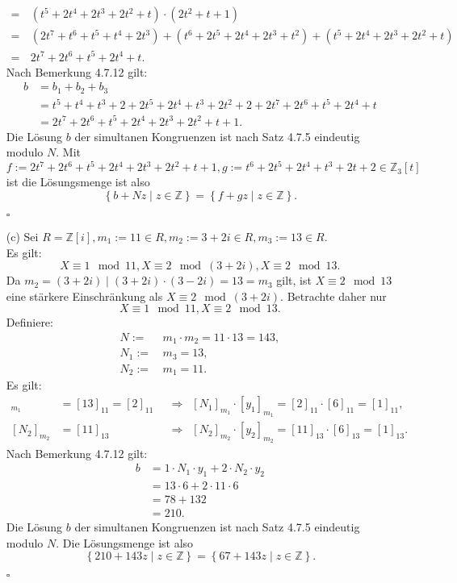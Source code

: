 \documentclass[12pt]{article}
\newcommand{\QED}{\begin{flushright} $\square$ \end{flushright}}
\newcommand{\df}{\enspace\Longrightarrow\enspace}
\begin{document}
\begin{enumerate}
\begin{align*}
		=&\,(t^5+2t^4+2t^3+2t^2+t)\cdot(2t^2+t+1) \\
		=&\,(2t^7+t^6+t^5+t^4+2t^3)+(t^6+2t^5+2t^4+2t^3+t^2)+(t^5+2t^4+2t^3+2t^2+t) \\
		=&\,2t^7+2t^6+t^5+2t^4+t.
	\end{align*}
	Nach Bemerkung 4.7.12 gilt:
	\begin{align*}
		b&=b_1+b_2+b_3 \\
		&=t^5+t^4+t^3+2+2t^5+2t^4+t^3+2t^2+2+2t^7+2t^6+t^5+2t^4+t \\
		&=2t^7+2t^6+t^5+2t^4+2t^3+2t^2+t+1.
	\end{align*}
	Die Lösung $b$ der simultanen Kongruenzen ist nach Satz 4.7.5 eindeutig modulo $N$. Mit $f:=2t^7+2t^6+t^5+2t^4+2t^3+2t^2+t+1,g:=t^6+2t^5+2t^4+t^3+2t+2\in\mathbb{Z}_3[t]$ ist die Lösungsmenge ist also
	$$\left\{b+Nz\mid z\in\mathbb{Z}\right\}=\left\{f+gz\mid z\in\mathbb{Z}\right\}.$$
	\QED
	
	\item[(c)] Sei $R=\mathbb{Z}[i],m_1:=11\in R,m_2:=3+2i\in R,m_3:=13\in R$. \\
	Es gilt: $$X\equiv1\mod11,X\equiv2\mod(3+2i),X\equiv2\mod13.$$
	Da $m_2=(3+2i)\mid(3+2i)\cdot(3-2i)=13=m_3$ gilt, ist $X\equiv2\mod13$ eine stärkere Einschränkung als $X\equiv2\mod(3+2i)$. Betrachte daher nur $$X\equiv1\mod11,X\equiv2\mod13.$$
	Definiere:
	\begin{align*}
		N:=&\,m_1\cdot m_2=11\cdot13=143, \\
		N_1:=&\,m_3=13, \\
		N_2:=&\,m_1=11.
	\end{align*}
	Es gilt:
	\begin{align*}
		[N_1]_{m_1}&=[13]_{11}=[2]_{11}&\df[N_1]_{m_1}\cdot[y_1]_{m_1}=[2]_{11}\cdot[6]_{11}=[1]_{11}, \\
		[N_2]_{m_2}&=[11]_{13}&\df[N_2]_{m_2}\cdot[y_2]_{m_2}=[11]_{13}\cdot[6]_{13}=[1]_{13}.
	\end{align*}
	Nach Bemerkung 4.7.12 gilt:
	\begin{align*}
		b&=1\cdot N_1\cdot y_1+2\cdot N_2\cdot y_2 \\
		&=13\cdot6+2\cdot11\cdot6 \\
		&=78+132 \\
		&=210.
	\end{align*}
	Die Lösung $b$ der simultanen Kongruenzen ist nach Satz 4.7.5 eindeutig modulo $N$. Die Lösungsmenge ist also
	$$\left\{210+143z\mid z\in\mathbb{Z}\right\}=\left\{67+143z\mid z\in\mathbb{Z}\right\}.$$
	\QED
\end{enumerate}
\end{document}
